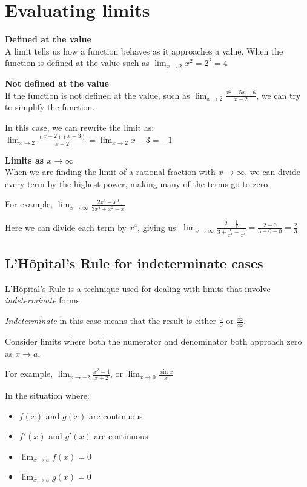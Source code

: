 \documentclass[../main.tex]{subfiles}
\begin{document}
\section{Evaluating limits}

\textbf{Defined at the value}\\
A limit tells us how a function behaves as it approaches a value. When the function is defined at the value such as $\displaystyle \lim_{x\rightarrow 2} x^2=2^2=4$

\textbf{Not defined at the value}\\
If the function is not defined at the value, such as $\displaystyle \lim_{x\rightarrow 2} \frac{x^2-5x+6}{x-2}$, we can try to simplify the function.

In this case, we can rewrite the limit as: $\displaystyle \lim_{x\rightarrow 2} \frac{(x-2)(x-3)}{x-2}=\lim_{x\rightarrow 2} x-3=-1$

\textbf{Limits as $x\rightarrow \infty$}\\
When we are finding the limit of a rational fraction with $x\rightarrow \infty$, we can divide every term by the highest power, making many of the terms go to zero.

For example, $\displaystyle \lim_{x\rightarrow \infty} \frac{2x^4-x^3}{3x^4+x^2-x}$

Here we can divide each term by $x^4$, giving us: $\displaystyle \lim_{x\rightarrow \infty} \frac{2-\frac{1}{x}}{3+\frac{1}{x^2}-\frac{1}{x^3}}=\frac{2-0}{3+0-0}=\frac{2}{3}$


\subsection*{L'H\^{o}pital's Rule for indeterminate cases}
L'H\^{o}pital's Rule is a technique used for dealing with limits that involve \textit{indeterminate} forms.

\textit{Indeterminate} in this case means that the result is either $\frac{0}{0}$ or $\frac{\infty}{\infty}$.

Consider limits where both the numerator and denominator both approach zero as $x \rightarrow a$.

For example, $\displaystyle \lim_{x\rightarrow -2} \frac{x^2-4}{x+2}$, or $\displaystyle \lim_{x\rightarrow 0}\frac{\sin{x}}{x}$

In the situation where:

\begin{itemize}
    \item $f(x)$ and $g(x)$ are continuous
    \item $f'(x)$ and $g'(x)$ are continuous
    \item $\displaystyle \lim_{x \rightarrow a}f(x)=0$
    \item $\displaystyle \lim_{x \rightarrow a}g(x)=0$
\end{itemize} 
\end{document}
